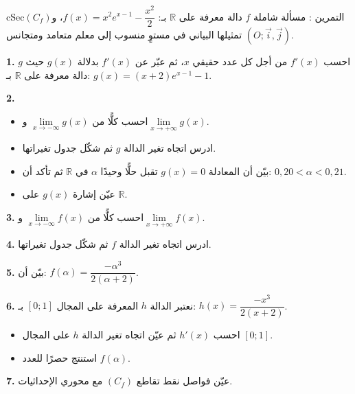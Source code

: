 \documentclass[12pt,a4paper]{article}
\newenvironment{BOX}[2]{\begin{otherlanguage}{english}\begin{arbox}{#1}{#2}}{\end{arbox}\end{otherlanguage}}
\newcounter{exo}
\newenvironment{tamrin}[1]{\stepcounter{exo}\begin{BOX}{cSec}{التمرين \theexo: #1}}{\end{BOX}}
\newcommand{\R}{\mathbb{R}}
\newenvironment{sq}{\begin{itemize}[leftmargin=2.4em,itemsep=3pt]}{\end{itemize}}
\newcommand{\qa}{\item[(أ)]}\newcommand{\qb}{\item[(ب)]}\newcommand{\qc}{\item[(جـ)]}\newcommand{\qd}{\item[(د)]}\newcommand{\qe}{\item[(هـ)]}
\newcommand{\QQ}[1]{\par\smallskip\textbf{#1.} }
\begin{document}
\begin{tamrin}{مسألة شاملة}
$f$ دالة معرفة على $\R$ بـ: $f(x)=x^2e^{x-1}-\dfrac{x^2}{2}$، و$(C_f)$ تمثيلها البياني في مستوٍ منسوب إلى معلم متعامد ومتجانس $(O;\vec i,\vec j)$.
\QQ{1} احسب $f'(x)$ من أجل كل عدد حقيقي $x$، ثم عبّر عن $f'(x)$ بدلالة $g(x)$ حيث $g$ دالة معرفة على $\R$ بـ: $g(x)=(x+2)e^{x-1}-1$.
\QQ{2}
\begin{sq}
\qa احسب كلًّا من $\lim\limits_{x\to-\infty}g(x)$ و$\lim\limits_{x\to+\infty}g(x)$.
\qb ادرس اتجاه تغير الدالة $g$ ثم شكّل جدول تغيراتها.
\qc بيّن أن المعادلة $g(x)=0$ تقبل حلًّا وحيدًا $\alpha$ في $\R$ ثم تأكد أن: $0{,}20<\alpha<0{,}21$.
\qd عيّن إشارة $g(x)$ على $\R$.
\end{sq}
\QQ{3} احسب كلًّا من $\lim\limits_{x\to-\infty}f(x)$ و$\lim\limits_{x\to+\infty}f(x)$.
\QQ{4} ادرس اتجاه تغير الدالة $f$ ثم شكّل جدول تغيراتها.
\QQ{5} بيّن أن: $f(\alpha)=\dfrac{-\alpha^3}{2(\alpha+2)}$.
\QQ{6} نعتبر الدالة $h$ المعرفة على المجال $[0;1]$ بـ: $h(x)=\dfrac{-x^3}{2(x+2)}$.
\begin{sq}
\qa احسب $h'(x)$ ثم عيّن اتجاه تغير الدالة $h$ على المجال $[0;1]$.
\qb استنتج حصرًا للعدد $f(\alpha)$.
\end{sq}
\QQ{7} عيّن فواصل نقط تقاطع $(C_f)$ مع محوري الإحداثيات.
\end{tamrin}
\end{document}
